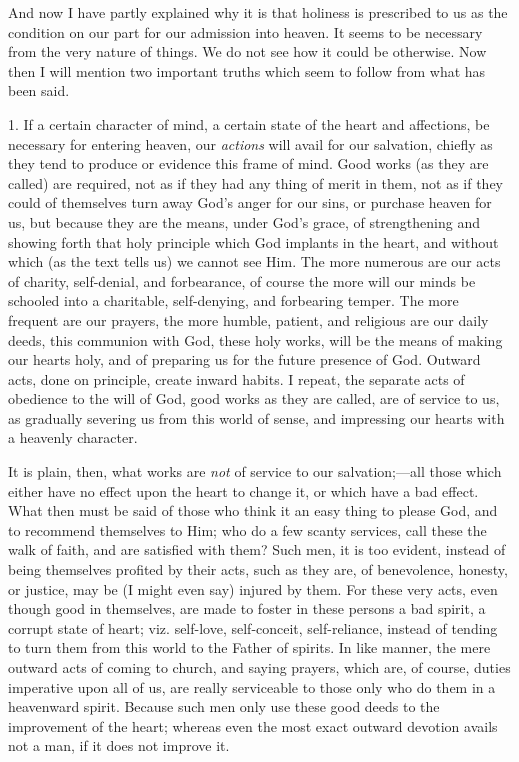 And now I have partly explained why it is that
holiness is prescribed to us as the condition on our part
for our admission into heaven. It seems to be necessary
from the very nature of things. We do not see how it
could be otherwise. Now then I will mention two important
truths which seem to follow from what has been said.

1. If a certain character of mind, a certain state of
the heart and affections, be necessary for entering
heaven, our \emph{actions} will avail for our
salvation, chiefly as they tend to produce or evidence
this frame of mind. Good works (as they are called) are
required, not as if they had any thing of merit in them,
not as if they could of themselves turn away God's anger
for our sins, or purchase heaven for us, but because they
are the means, under God's grace, of strengthening and
showing forth that holy principle which God implants in
the heart, and without which (as the text tells us) we
cannot see Him. The more numerous are our acts of
charity, self-denial, and forbearance, of course the more
will our minds be schooled into a charitable,
self-denying, and forbearing temper. The more frequent
are our prayers, the more humble, patient, and religious
are our daily deeds, this communion with God, these holy
works, will be the means of making our hearts holy, and
of preparing us for the future presence of God. Outward
acts, done on principle, create inward habits. I repeat,
the separate acts of obedience to the will of God, good
works as they are called, are of service to us, as
gradually severing us from this world of sense, and
impressing our hearts with a heavenly character.

It is plain, then, what works are \emph{not} of
service to our salvation;—all those which either
have no effect upon the heart to change it, or which have
a bad effect. What then must be said of those who think
it an easy thing to please God, and to recommend
themselves to Him; who do a few scanty services, call
these the walk of faith, and are satisfied with them?
Such men, it is too evident, instead of being themselves
profited by their acts, such as they are, of benevolence,
honesty, or justice, may be (I might even say) injured by
them. For these very acts, even though good in
themselves, are made to foster in these persons a bad
spirit, a corrupt state of heart; viz. self-love,
self-conceit, self-reliance, instead of tending to turn
them from this world to the Father of spirits. In like
manner, the mere outward acts of coming to church, and
saying prayers, which are, of course, duties imperative
upon all of us, are really serviceable to those only who
do them in a heavenward spirit. Because such men only use
these good deeds to the improvement of the heart; whereas
even the most exact outward devotion avails not a man, if
it does not improve it.

